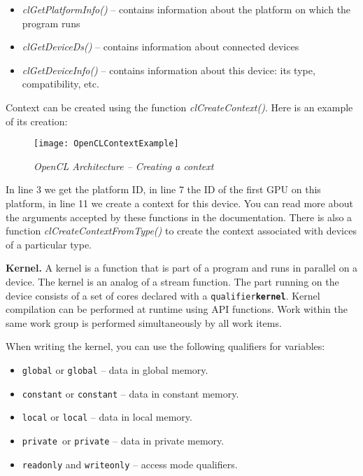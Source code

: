 {\begin{itemize}
			\item\textit{clGetPlatformInfo()} – contains information about the platform on which the program runs
			\item\textit{clGetDeviceDs()} – contains information about connected devices
			\item\textit{clGetDeviceInfo()} – contains information about this device: its type, compatibility, etc.
		\end{itemize}
Context can be created using the function \textit{clCreateContext()}. Here is an example of its creation:
	\begin{figure}[H]
		\texttt{[image: OpenCLContextExample]}
		\caption{\textit{OpenCL Architecture – Creating a context}}
		\label{OpenCLContextExample:image}
	\end{figure}
In line 3 we get the platform ID, in line 7 the ID of the first GPU on this platform, in line 11 we create a context for this device. You can read more about the arguments accepted by these functions in the documentation. There is also a function \textit{clCreateContextFromType()} to create the context associated with devices of a particular type.
	\par\textbf{Kernel.} A kernel is a function that is part of a program and runs in parallel on a device. The kernel is an analog of a stream function. The part running on the device consists of a set of cores declared with a \texttt{qualifier\textbf{\textunderscore \textunderscore kernel}}. Kernel compilation can be performed at runtime using API functions. Work within the same work group is performed simultaneously by all work items.
	\par When writing the kernel, you can use the following qualifiers for variables:
		\begin{itemize}
			\item\texttt{\textunderscore \textunderscore global} or \texttt{global} – data in global memory.
			\item\texttt{\textunderscore \textunderscore constant} or \texttt{constant} – data in constant memory.
			\item\texttt{\textunderscore \textunderscore local} or \texttt{local} – data in local memory.
			\item\texttt{\textunderscore\textunderscore private }or \texttt{private} – data in private memory.
			\item\texttt{\textunderscore \textunderscore read\textunderscore only} and \texttt{\textunderscore \textunderscore write\textunderscore only} – access mode qualifiers.

\end{itemize}}
